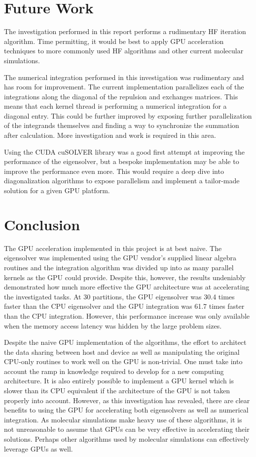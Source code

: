 \documentclass[conference, twoside]{IEEEtran}
\begin{document}
\section{Future Work} %

The investigation performed in this report performs a rudimentary HF iteration algorithm. Time permitting, it would be best to apply GPU acceleration techniques to more commonly used HF algorithms and other current molecular simulations.

The numerical integration performed in this investigation was rudimentary and has room for improvement. The current implementation parallelizes each of the integrations along the diagonal of the repulsion and exchanges matrices. This means that each kernel thread is performing a numerical integration for a diagonal entry. This could be further improved by exposing further parallelization of the integrands themselves and finding a way to synchronize the summation after calculation. More investigation and work is required in this area.

Using the CUDA cuSOLVER library was a good first attempt at improving the performance of the eigensolver, but a bespoke implementation may be able to improve the performance even more. This would require a deep dive into diagonalization algorithms to expose parallelism and implement a tailor-made solution for a given GPU platform.

\section{Conclusion} %

The GPU acceleration implemented in this project is at best naive. The eigensolver was implemented using the GPU vendor's supplied linear algebra routines and the integration algorithm was divided up into as many parallel kernels as the GPU could provide. Despite this, however, the results undeniably demonstrated how much more effective the GPU architecture was at accelerating the investigated tasks. At 30 partitions, the GPU eigensolver was 30.4 times faster than the CPU eigensolver and the GPU integration was 61.7 times faster than the CPU integration. However, this performance increase was only available when the memory access latency was hidden by the large problem sizes.

Despite the naive GPU implementation of the algorithms, the effort to architect the data sharing between host and device as well as manipulating the original CPU-only routines to work well on the GPU is non-trivial. One must take into account the ramp in knowledge required to develop for a new computing architecture. It is also entirely possible to implement a GPU kernel which is slower than its CPU equivalent if the architecture of the GPU is not taken properly into account. However, as this investigation has revealed, there are clear benefits to using the GPU for accelerating both eigensolvers as well as numerical integration. As molecular simulations make heavy use of these algorithms, it is not unreasonable to assume that GPUs can be very effective in accelerating their solutions. Perhaps other algorithms used by molecular simulations can effectively leverage GPUs as well.



\end{document}
